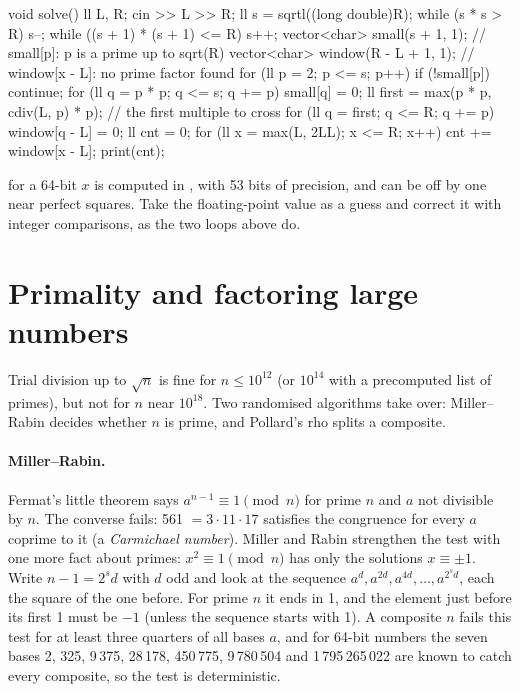 \begin{code}
void solve() {
    ll L, R;
    cin >> L >> R;
    ll s = sqrtl((long double)R);
    while (s * s > R) s--;
    while ((s + 1) * (s + 1) <= R) s++;
    vector<char> small(s + 1, 1);       // small[p]: p is a prime up to sqrt(R)
    vector<char> window(R - L + 1, 1);  // window[x - L]: no prime factor found
    for (ll p = 2; p <= s; p++) {
        if (!small[p]) continue;
        for (ll q = p * p; q <= s; q += p) small[q] = 0;
        ll first = max(p * p, cdiv(L, p) * p);  // the first multiple to cross
        for (ll q = first; q <= R; q += p) window[q - L] = 0;
    }
    ll cnt = 0;
    for (ll x = max(L, 2LL); x <= R; x++) cnt += window[x - L];
    print(cnt);
}
\end{code}

\begin{pitfall}
 for a 64-bit $x$ is computed in , with 53 bits of precision, and can be off by one near perfect squares. Take the
floating-point value as a guess and correct it with integer comparisons, as the two  loops above do.
\end{pitfall}

\section[Primality and factoring large numbers]{Primality and factoring large numbers \hfill \ioi}\label{sec:pollard}

Trial division up to $\sqrt n$ is fine for $n \le 10^{12}$ (or $10^{14}$ with a precomputed list of primes), but not for $n$ near
$10^{18}$. Two randomised algorithms take over: Miller--Rabin decides whether $n$ is prime, and Pollard's rho splits a composite.

\paragraph{Miller--Rabin.} Fermat's little theorem says $a^{n-1} \equiv 1 \pmod n$ for prime $n$ and $a$ not divisible by $n$. The
converse fails: 561 $= 3 \cdot 11 \cdot 17$ satisfies the congruence for every $a$ coprime to it (a \emph{Carmichael number}). Miller and
Rabin strengthen the test with one more fact about primes: $x^2 \equiv 1 \pmod n$ has only the solutions $x \equiv \pm 1$. Write
$n - 1 = 2^s d$ with $d$ odd and look at the sequence $a^d, a^{2d}, a^{4d}, \dots, a^{2^s d}$, each the square of the one before. For
prime $n$ it ends in 1, and the element just before its first 1 must be $-1$ (unless the sequence starts with 1). A composite $n$ fails
this test for at least three quarters of all bases $a$, and for 64-bit numbers the seven bases 2, 325, 9\,375, 28\,178, 450\,775,
9\,780\,504 and 1\,795\,265\,022 are known to catch every composite, so the test is deterministic.

